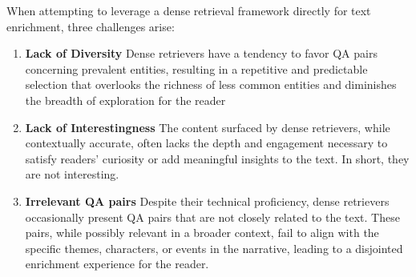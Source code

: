 \documentclass[11pt]{article}
\begin{document}



When attempting to leverage a dense retrieval framework \cite{DBLP:conf/emnlp/KarpukhinOMLWEC20} directly for text enrichment, three challenges arise:
\begin{enumerate}
    \item \textbf{Lack of Diversity} Dense retrievers have a tendency to favor QA pairs concerning prevalent entities, resulting in a repetitive and predictable selection that overlooks the richness of less common entities and diminishes the breadth of exploration for the reader
    \item \textbf{Lack of Interestingness} The content surfaced by dense retrievers, while contextually accurate, often lacks the depth and engagement necessary to satisfy readers' curiosity or add meaningful insights to the text. In short, they are not interesting.
    \item \textbf{Irrelevant QA pairs} Despite their technical proficiency, dense retrievers occasionally present QA pairs that are not closely related to the text. These pairs, while possibly relevant in a broader context, fail to align with the specific themes, characters, or events in the narrative, leading to a disjointed enrichment experience for the reader.
    
\end{enumerate}
\end{document}
